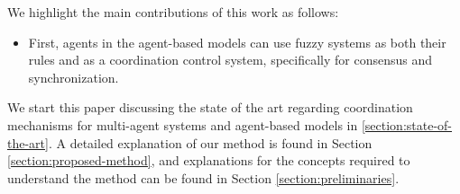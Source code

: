 We highlight the main contributions of this work as follows:
\begin{itemize}
  \item First, agents in the agent-based models can use fuzzy systems
as both their rules and as a coordination control system, specifically
for consensus and synchronization.
\end{itemize}

We start this paper discussing the state of the art regarding
coordination mechanisms for multi-agent systems and agent-based models
in \ref{section:state-of-the-art}. A detailed explanation of our
method is found in Section \ref{section:proposed-method}, and
explanations for the concepts required to understand the method can be
found in Section \ref{section:preliminaries}.